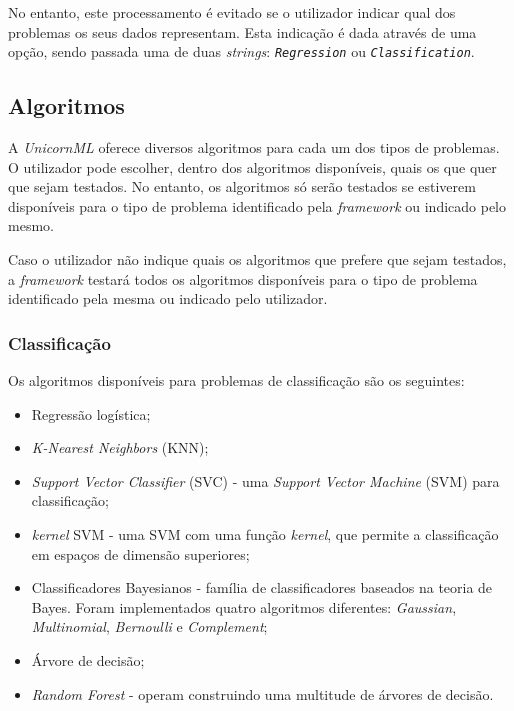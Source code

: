\documentclass[a4paper]{report}
\begin{document}
{		No entanto, este processamento é evitado se o utilizador indicar qual dos problemas os seus dados representam.
		Esta indicação é dada através de uma opção, sendo passada uma de duas \textit{strings}: \textit{\texttt{Regression}} ou \textit{\texttt{Classification}}.

		\subsection{Algoritmos} \label{subsec:Algorithms}
		A \textsl{UnicornML} oferece diversos algoritmos para cada um dos tipos de problemas. 
		O utilizador pode escolher, dentro dos algoritmos disponíveis, quais os que quer que sejam testados. 
		No entanto, os algoritmos só serão testados se estiverem disponíveis para o tipo de problema identificado pela \textit{framework} ou indicado pelo mesmo.

		Caso o utilizador não indique quais os algoritmos que prefere que sejam testados, a \textit{framework} testará todos os algoritmos disponíveis para o tipo de problema identificado pela mesma ou indicado pelo utilizador.
            
			\subsubsection{Classificação} \label{sssec:Classification1}
			Os algoritmos disponíveis para problemas de classificação são os seguintes:
			\begin{itemize}
				\item Regressão logística;
				\item \textit{K-Nearest Neighbors} (KNN);
				\item \textit{Support Vector Classifier} (SVC) - uma \textit{Support Vector Machine} (SVM) para classificação;
				\item \textit{kernel} SVM - uma SVM com uma função \textit{kernel}, que permite a classificação em espaços de dimensão superiores;
				\item Classificadores Bayesianos - família de classificadores baseados na teoria de Bayes. Foram implementados quatro algoritmos diferentes: \textit{Gaussian}, \textit{Multinomial}, \textit{Bernoulli} e \textit{Complement};
				\item Árvore de decisão;
				\item \textit{Random Forest} - operam construindo uma multitude de árvores de decisão.
			\end{itemize}

}
\end{document}
